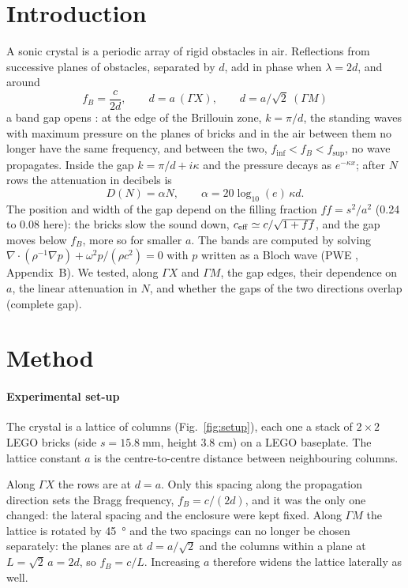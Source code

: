 \documentclass[9pt,a4paper,twocolumn]{extarticle}
\newcommand{\GX}{\ensuremath{\Gamma X}}
\newcommand{\GM}{\ensuremath{\Gamma M}}
\newcommand{\finf}{\ensuremath{f_{\mathrm{inf}}}}
\newcommand{\fsup}{\ensuremath{f_{\mathrm{sup}}}}
\begin{document}
\section{Introduction}
A sonic crystal is a periodic array of rigid obstacles in air. Reflections from successive planes of obstacles, separated by $d$, add in phase when $\lambda=2d$, and around
\begin{equation}
f_B=\frac{c}{2d},\qquad d=a\ (\GX),\qquad d=a/\sqrt2\ (\GM)
\end{equation}
a band gap opens \cite{chen,romero}: at the edge of the Brillouin zone, $k=\pi/d$, the standing waves with maximum pressure on the planes of bricks and in the air between them no longer have the same frequency, and between the two, $\finf<f_B<\fsup$, no wave propagates. Inside the gap $k=\pi/d+i\kappa$ and the pressure decays as $e^{-\kappa x}$; after $N$ rows the attenuation in decibels is
\begin{equation}
D(N)=\alpha N,\qquad \alpha=20\log_{10}(e)\,\kappa d.
\end{equation}
The position and width of the gap depend on the filling fraction $ff=s^2/a^2$ (0.24 to 0.08 here): the bricks slow the sound down, $c_{\rm eff}\simeq c/\sqrt{1+ff}$, and the gap moves below $f_B$, more so for smaller $a$. The bands are computed by solving $\nabla\!\cdot(\rho^{-1}\nabla p)+\omega^2p/(\rho c^2)=0$ with $p$ written as a Bloch wave (PWE \cite{romero}, Appendix~B). We tested, along \GX{} and \GM, the gap edges, their dependence on $a$, the linear attenuation in $N$, and whether the gaps of the two directions overlap (complete gap).

\section{Method}

\paragraph{Experimental set-up}
The crystal is a lattice of columns (Fig.~\ref{fig:setup}), each one a stack of $2\times2$ LEGO bricks (side $s = \SI{15.8}{\milli\metre}$, height 3.8 cm) on a LEGO baseplate. The lattice constant $a$ is the centre-to-centre distance between neighbouring columns.

Along $\Gamma X$ the rows are at $d = a$. Only this spacing along the propagation direction sets the Bragg frequency, $f_B = c/(2d)$, and it was the only one changed: the lateral spacing and the enclosure were kept fixed. Along $\Gamma M$ the lattice is rotated by \SI{45}{\degree} and the two spacings can no longer be chosen separately: the planes are at $d = a/\sqrt{2}$ and the columns within a plane at $L = \sqrt{2}\,a = 2d$, so $f_B = c/L$. Increasing $a$ therefore widens the lattice laterally as well.
\end{document}
